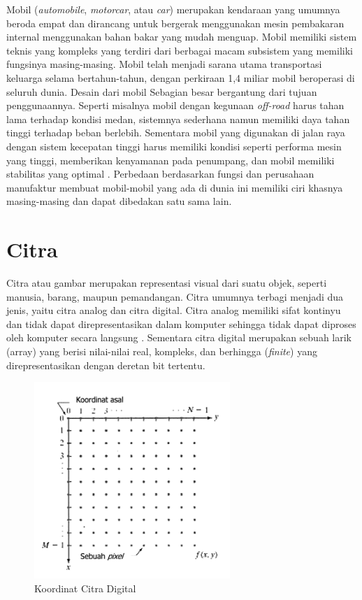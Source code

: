 Mobil (\emph{automobile}, \emph{motorcar}, atau \emph{car}) merupakan kendaraan yang umumnya beroda empat dan dirancang untuk bergerak 
menggunakan mesin pembakaran internal menggunakan bahan bakar yang mudah menguap. Mobil memiliki sistem teknis yang 
kompleks yang terdiri dari berbagai macam subsistem yang memiliki fungsinya masing-masing. Mobil telah menjadi sarana 
utama transportasi keluarga selama bertahun-tahun, dengan perkiraan 1,4 miliar mobil beroperasi di seluruh dunia. Desain 
dari mobil Sebagian besar bergantung dari tujuan penggunaannya. Seperti misalnya mobil dengan kegunaan \emph{off-road} harus tahan 
lama terhadap kondisi medan, sistemnya sederhana namun memiliki daya tahan tinggi terhadap beban berlebih. Sementara mobil 
yang digunakan di jalan raya dengan sistem kecepatan tinggi harus memiliki kondisi seperti performa mesin yang tinggi, 
memberikan kenyamanan pada penumpang, dan mobil memiliki stabilitas yang optimal \parencite{Cromer2023}. Perbedaan 
berdasarkan fungsi dan perusahaan manufaktur membuat mobil-mobil yang ada di dunia ini memiliki ciri khasnya masing-masing 
dan dapat dibedakan satu sama lain.

\section{Citra}
\label{sec:citra}

Citra atau gambar merupakan representasi visual dari suatu objek, seperti manusia, barang, maupun pemandangan. Citra 
umumnya terbagi menjadi dua jenis, yaitu citra analog dan citra digital. Citra analog memiliki sifat kontinyu dan tidak 
dapat direpresentasikan dalam komputer sehingga tidak dapat diproses oleh komputer secara langsung \parencite{Tyagi2018}. 
Sementara citra digital merupakan sebuah larik (array) yang berisi nilai-nilai real, kompleks, dan berhingga (\emph{finite}) 
yang direpresentasikan dengan deretan bit tertentu. 

\begin{figure}[ht]
  \centering
  \includegraphics[scale=1]{gambar/Koordinat Citra Digital.png}
  \caption{Koordinat Citra Digital}
  \label{fig:koordinatcitradigital}
\end{figure}

